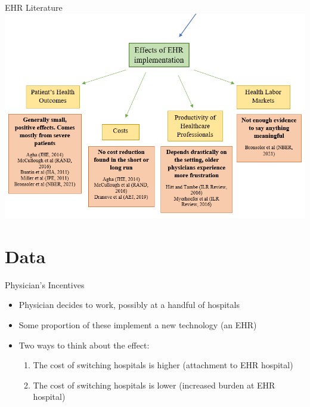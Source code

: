 \documentclass[10pt]{beamer}
\begin{document}
\begin{frame}{EHR Literature}
    \centering
    \includegraphics[scale=.45]{graphics/EHR_litgraphic.PNG}
\end{frame}


\section{Data}


\begin{frame}{Physician's Incentives}
\begin{itemize}
    \item Physician decides to work, possibly at a handful of hospitals
    \item Some proportion of these implement a new technology (an EHR)
    \item Two ways to think about the effect:
    \begin{enumerate}
        \item The cost of switching hospitals is higher (attachment to EHR hospital)
        \item The cost of switching hospitals is lower (increased burden at EHR hospital)
    \end{enumerate}
\end{itemize}
\end{frame}
\end{document}
